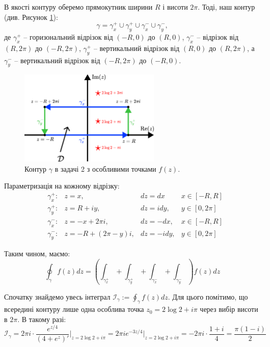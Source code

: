 \documentclass[oneside,solution]{karazin-complan-assign}
\begin{document}
В якості контуру оберемо прямокутник ширини $R$ і висоти $2\pi$. Тоді, наш контур (див. Рисунок \ref{fig:contour_2}):
\begin{equation}
    \gamma = \gamma_x^+ \cup \gamma_y^+ \cup \gamma_x^- \cup \gamma_y^-,
\end{equation}
де $\gamma_x^+$ -- горизональний відрізок від $(-R,0)$ до $(R,0)$, $\gamma_x^-$ -- відрізок від $(R,2\pi)$ до $(-R,2\pi)$, $\gamma_y^+$ -- вертикальний відрізок від $(R,0)$ до $(R,2\pi)$, а $\gamma_y^-$ -- вертикальний відрізок від $(-R,2\pi)$ до $(-R,0)$. 

\begin{figure}
    \centering
    \includegraphics[width=0.6\textwidth]{images/hw_3/contour_2.pdf}
    \caption{Контур $\gamma$ в задачі 2 з особливими точками $f(z)$.}
    \label{fig:contour_2}
\end{figure}

Параметризація на кожному відрізку:
\begin{align}
    &\gamma_x^+: & z = x, & dz = dx & x \in [-R,R] \\
    &\gamma_y^+: & z = R + iy, & dz = idy, & y \in [0,2\pi] \\
    &\gamma_x^-: & z = -x + 2\pi i, & dz = -dx, & x \in [-R,R] \\
    &\gamma_y^-: & z = -R + (2\pi - y)i, & dz = -idy, & y \in [0,2\pi]
\end{align}

Таким чином, маємо:
\begin{equation}\label{eq:1}
    \oint_{\gamma} f(z)dz = \left(\int_{\gamma_x^+} + \int_{\gamma_y^+} + \int_{\gamma_x^-} + \int_{\gamma_y^-}\right)f(z)dz
\end{equation}

Спочатку знайдемо увесь інтеграл $\mathcal{I}_{\gamma} := \oint_{\gamma}f(z)dz$. Для цього помітимо, що всередині контуру лише одна особлива точка $z_0 = 2\log 2 + i\pi$ через вибір висоти в $2\pi$. В такому разі:
\begin{equation*}
    \mathcal{I}_{\gamma} = 2\pi i \cdot \frac{e^{z/4}}{(4+e^z)'}\Big|_{z=2\log 2 + i\pi} = 2\pi i e^{-3z/4}\Big|_{z=2\log 2 + i\pi} = -2\pi i \cdot \frac{1+i}{4} = \frac{\pi(1-i)}{2}
\end{equation*}
\end{document}
